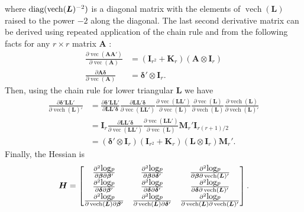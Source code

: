 \documentclass[12pt]{article}
\def\diag{\hbox{diag}}
\def\diag{\hbox{diag}}
\def\log{\hbox{log}}
\DeclareMathOperator{\vect}{vec}
\DeclareMathOperator{\vech}{vech}
\begin{document}
where $\diag(\vech(\bm{L})^{-2})$ is a diagonal matrix with the elements of $\vech(\bm{L})$ raised to the power $-2$ along the diagonal. The last second derivative matrix can be derived using repeated application of the chain rule and from the following facts for any $r\times r$ matrix $\bm{A}$ \citep{magnus2007matrix}:
\begin{align*}
\frac{\partial \vect(\bm{A}\bm{A}')}{\partial \vect(\bm{A})} & = (\bm{I}_{r^2} + \bm{K}_r)(\bm{A}\otimes \bm{I}_r)\\
\frac{\partial \bm{A}\bm{\delta}}{\partial \vect(\bm{A})}& = \bm{\delta}' \otimes \bm{I}_r.
\end{align*}
Then, using the chain rule for lower triangular $\bm{L}$ we have
\begin{align*}
\frac{\partial \bm{\delta}'\bm{L}\bm{L'}}{\partial\vech(\bm{L})'} &= \frac{\partial \bm{\delta}'\bm{L}\bm{L'}}{\partial \bm{L}\bm{L}'\bm{\delta}} \frac{\partial \bm{L}\bm{L}'\bm{\delta}}{\partial \vect(\bm{L}\bm{L}')} \frac{\partial \vect(\bm{L}\bm{L}')}{\partial \vect(\bm{L})}\frac{\partial \vect(\bm{L})}{\partial \vech(\bm{L})}\frac{\partial \vech(\bm{L})}{\partial \vech(\bm{L})'}\\
&= \bm{I}_r \frac{\partial \bm{L}\bm{L}'\bm{\delta}}{\partial \vect(\bm{L}\bm{L}')} \frac{\partial \vect(\bm{L}\bm{L}')}{\partial \vect(\bm{L})} \bm{M}_r'\bm{I}_{r(r+1)/2}\\
&= (\bm{\delta}' \otimes \bm{I}_r)(\bm{I}_{r^2} + \bm{K}_r)(\bm{L}\otimes \bm{I}_r) \bm{M}_r'.
\end{align*}
Finally, the Hessian is
\begin{align*}
\bm{H} = \begin{bmatrix} \frac{\partial^2 \log p}{\partial \bm{\beta} \partial \bm{\beta}'} & \frac{\partial^2 \log p}{\partial \bm{\beta} \partial \bm{\delta} '} & \frac{\partial^2 \log p}{\partial \bm{\beta} \partial \vech(\bm{L}) '}\\
\frac{\partial^2 \log p}{\partial \bm{\delta} \partial \bm{\beta}'}  & \frac{\partial^2 \log p}{ \partial \bm{\delta} \partial \bm{\delta}'} & \frac{\partial^2 \log p}{ \partial \bm{\delta} \partial \vech(\bm{L})'}\\
\frac{\partial^2 \log p}{\partial \vech(\bm{L}) \partial \bm{\beta}'} & \frac{\partial^2 \log p}{ \partial \vech(\bm{L}) \partial \bm{\delta}'} & \frac{\partial^2 \log p}{\partial \vech(\bm{L}) \partial \vech(\bm{L})'} 
\end{bmatrix}.
\end{align*}
\end{document}
